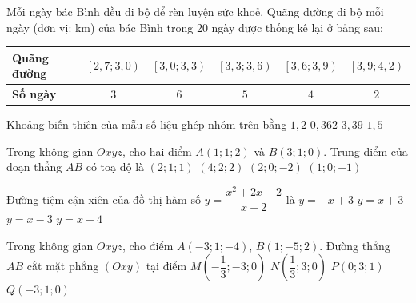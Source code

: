 \documentclass[12pt,a4paper]{article}
\providecommand{\macau}[1]{}
\begin{document}
\begin{ex}
	\macau{ID: DETHI2009-C09}Mỗi ngày bác Bình đều đi bộ để rèn luyện sức khoẻ. Quãng đường đi bộ mỗi ngày (đơn vị: $\text{km}$) của bác Bình trong 20 ngày được thống kê lại ở bảng sau:
	\begin{center}
		\begin{tabular}{|l|c|c|c|c|c|}
			\hline
			\textbf{Quãng đường} & $\left[2{,}7; 3{,}0\right)$ & $\left[3{,}0; 3{,}3\right)$ & $\left[3{,}3; 3{,}6\right)$ & $\left[3{,}6; 3{,}9\right)$ & $\left[3{,}9; 4{,}2\right)$ \\
			\hline
			\textbf{Số ngày} & $3$ & $6$ & $5$ & $4$ & $2$ \\
			\hline
		\end{tabular}
	\end{center}
	Khoảng biến thiên của mẫu số liệu ghép nhóm trên bằng
	\choice
	{$1{,}2$}
	{$0{,}362$}
	{$3{,}39$}
	{\True $1{,}5$}
	\loigiai{}
\end{ex}

\begin{ex}
	\macau{ID: DETHI2009-C10}Trong không gian $Oxyz$, cho hai điểm $A(1; 1; 2)$ và $B(3; 1; 0)$. Trung điểm của đoạn thẳng $AB$ có toạ độ là
	\choice
	{\True $(2; 1; 1)$}
	{$(4; 2; 2)$}
	{$(2; 0; -2)$}
	{$(1; 0; -1)$}
	\loigiai{}
\end{ex}

\begin{ex}
	\macau{ID: DETHI2009-C11}Đường tiệm cận xiên của đồ thị hàm số $y = \dfrac{x^2 + 2x - 2}{x - 2}$ là
	\choice
	{$y = -x + 3$}
	{$y = x + 3$}
	{$y = x - 3$}
	{\True $y = x + 4$}
	\loigiai{}
\end{ex}

\begin{ex}
	\macau{ID: DETHI2009-C12}Trong không gian $Oxyz$, cho điểm $A(-3; 1; -4)$, $B(1; -5; 2)$. Đường thẳng $AB$ cắt mặt phẳng $(Oxy)$ tại điểm
	\choice
	{\True $M\left(-\dfrac{1}{3}; -3; 0\right)$}
	{$N\left(\dfrac{1}{3}; 3; 0\right)$}
	{$P(0; 3; 1)$}
	{$Q(-3; 1; 0)$}
	\loigiai{}
\end{ex}

\begin{flushleft}
	{\color{blue!50!green}}
\end{flushleft}
\setcounter{ex}{0}
\setcounter{bt}{0}
\end{document}
